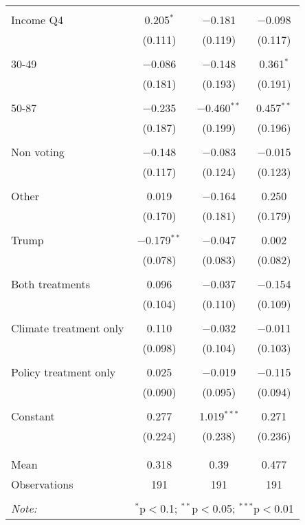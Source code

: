 \begin{tabular}{@{\extracolsep{5pt}}lccc}
  & & & \\ 
 Income Q4 & 0.205$^{*}$ & $-$0.181 & $-$0.098 \\ 
  & (0.111) & (0.119) & (0.117) \\ 
  & & & \\ 
 30-49 & $-$0.086 & $-$0.148 & 0.361$^{*}$ \\ 
  & (0.181) & (0.193) & (0.191) \\ 
  & & & \\ 
 50-87 & $-$0.235 & $-$0.460$^{**}$ & 0.457$^{**}$ \\ 
  & (0.187) & (0.199) & (0.196) \\ 
  & & & \\ 
 Non voting & $-$0.148 & $-$0.083 & $-$0.015 \\ 
  & (0.117) & (0.124) & (0.123) \\ 
  & & & \\ 
 Other & 0.019 & $-$0.164 & 0.250 \\ 
  & (0.170) & (0.181) & (0.179) \\ 
  & & & \\ 
 Trump & $-$0.179$^{**}$ & $-$0.047 & 0.002 \\ 
  & (0.078) & (0.083) & (0.082) \\ 
  & & & \\ 
 Both treatments & 0.096 & $-$0.037 & $-$0.154 \\ 
  & (0.104) & (0.110) & (0.109) \\ 
  & & & \\ 
 Climate treatment only & 0.110 & $-$0.032 & $-$0.011 \\ 
  & (0.098) & (0.104) & (0.103) \\ 
  & & & \\ 
 Policy treatment only & 0.025 & $-$0.019 & $-$0.115 \\ 
  & (0.090) & (0.095) & (0.094) \\ 
  & & & \\ 
 Constant & 0.277 & 1.019$^{***}$ & 0.271 \\ 
  & (0.224) & (0.238) & (0.236) \\ 
  & & & \\ 
\hline \\[-1.8ex] 
Mean & 0.318 & 0.39 & 0.477 \\ 
Observations & 191 & 191 & 191 \\ 
\hline 
\hline \\[-1.8ex] 
\textit{Note:}  & \multicolumn{3}{r}{$^{*}$p$<$0.1; $^{**}$p$<$0.05; $^{***}$p$<$0.01} \\ 
\end{tabular} 
